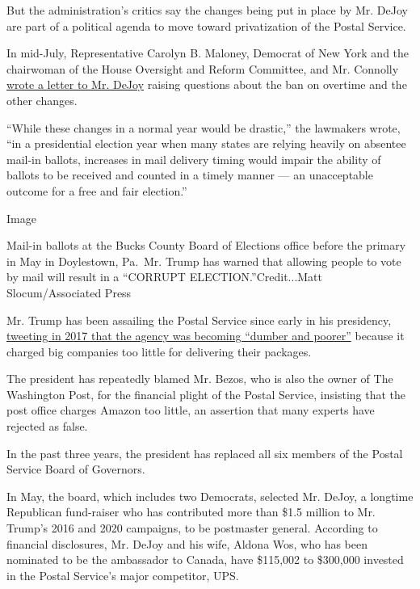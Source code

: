But the administration's critics say the changes being put in place by
Mr. DeJoy are part of a political agenda to move toward privatization of
the Postal Service.

In mid-July, Representative Carolyn B. Maloney, Democrat of New York and
the chairwoman of the House Oversight and Reform Committee, and Mr.
Connolly
\href{https://oversight.house.gov/sites/democrats.oversight.house.gov/files/2020-07-20.CBM\%20GEC\%20to\%20DeJoy\%20-PMG\%20re\%20Postal\%20Service\%20Changes.pdf}{wrote
a letter to Mr. DeJoy} raising questions about the ban on overtime and
the other changes.

``While these changes in a normal year would be drastic,'' the lawmakers
wrote, ``in a presidential election year when many states are relying
heavily on absentee mail-in ballots, increases in mail delivery timing
would impair the ability of ballots to be received and counted in a
timely manner --- an unacceptable outcome for a free and fair
election.''

Image

Mail-in ballots at the Bucks County Board of Elections office before the
primary in May in Doylestown, Pa.~Mr. Trump has warned that allowing
people to vote by mail will result in a ``CORRUPT
ELECTION.''Credit...Matt Slocum/Associated Press

Mr. Trump has been assailing the Postal Service since early in his
presidency,
\href{https://twitter.com/realDonaldTrump/status/946728546633953285?s=20}{tweeting
in 2017 that the agency was becoming ``dumber and poorer''} because it
charged big companies too little for delivering their packages.

The president has repeatedly blamed Mr. Bezos, who is also the owner of
The Washington Post, for the financial plight of the Postal Service,
insisting that the post office charges Amazon too little, an assertion
that many experts have rejected as false.

In the past three years, the president has replaced all six members of
the Postal Service Board of Governors.

In May, the board, which includes two Democrats, selected Mr. DeJoy, a
longtime Republican fund-raiser who has contributed more than \$1.5
million to Mr. Trump's 2016 and 2020 campaigns, to be postmaster
general. According to financial disclosures, Mr. DeJoy and his wife,
Aldona Wos, who has been nominated to be the ambassador to Canada, have
\$115,002 to \$300,000 invested in the Postal Service's major
competitor, UPS.

